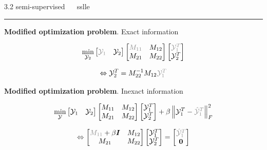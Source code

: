 \documentclass[11pt, compress, t, notes = noshow, xcolor = table, 
aspectratio = 1610]{beamer}
\newcommand{\Y}{\mathcal{Y}}
\newcommand{\I}{\bm{I}}
\newcommand{\frobnorm}[1]{\left\lVert #1 \right\rVert^2_F}
\begin{document}
\LARGE
\begin{frame}{\textcolor{gray!90}{3.2 semi-supervised} ~~ sslle}
\normalsize
\vspace{-0.5cm}
\noindent \textcolor{gray!90}{\rule{\textwidth}{1pt}}
\smallskip

\textbf{Modified optimization problem}. Exact information 

\begin{fleqn}
  \begin{equation}
    \min_{\Y_2}
    \begin{bmatrix} \textcolor{gray!90}{\Y_1} & \Y_2 \end{bmatrix}
    \begin{bmatrix} \textcolor{gray!90}{M_{11}} & M_{12} \\ M_{21} & M_{22} 
    \end{bmatrix}
    \begin{bmatrix} \textcolor{gray!90}{\Y_1^T} \\ \Y_2^T \end{bmatrix}
  \end{equation}
\end{fleqn}

\begin{fleqn}
  \begin{equation}
    \Leftrightarrow \Y_2^T = M_{22}^{-1} M_{12} \textcolor{gray!90}{\Y_1^T}
  \end{equation}
\end{fleqn}

\textbf{Modified optimization problem}. Inexact information 

\begin{fleqn}
  \begin{equation}
    \min_{\Y}
    \begin{bmatrix} \Y_1 & \Y_2 \end{bmatrix}
    \begin{bmatrix} M_{11} & M_{12} \\ M_{21} & M_{22} \end{bmatrix}
    \begin{bmatrix} \Y_1^T \\ \Y_2^T \end{bmatrix} +
    \beta \frobnorm{\Y_1^T - \textcolor{gray!90}{\hat{\Y}_1^T}}
  \end{equation}
\end{fleqn}

\begin{fleqn}
  \begin{equation}
    \Leftrightarrow \begin{bmatrix} \textcolor{gray!90}{M_{11}} +
    \beta \I & M_{12} \\ M_{21} & M_{22} \end{bmatrix}
    \begin{bmatrix} \Y_1^T \\ \Y_2^T \end{bmatrix} =
    \begin{bmatrix} \textcolor{gray!90}{\hat{\Y}_1^T} \\ \bm{0} \end{bmatrix}
  \end{equation}
\end{fleqn}


\end{frame}
\end{document}
